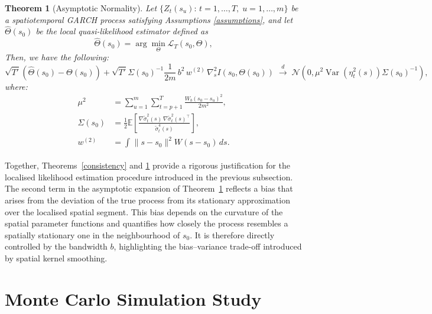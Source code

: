 \documentclass[fleqn,11pt]{article}
\newtheorem{theorem}{Theorem}
\begin{document}
\begin{theorem}[Asymptotic Normality]\label{normality}
Let $\{Z_t(s_u):\, t = 1,\dots,T,\; u = 1,\dots,m\}$ be a spatiotemporal GARCH process satisfying Assumptions \ref{assumptions}, and let $\hat\Theta(s_0)$ be the local quasi-likelihood estimator defined as
$$
\hat\Theta(s_0) = \arg \min_{\Theta } \mathcal{L}_T(s_0, \Theta),
$$
Then, we have the following:\\
$$
\sqrt{T'}\left(\hat{\Theta}(s_0)-\Theta(s_0)\right) + \sqrt{T'} \Sigma(s_0)^{-1}  \frac{1}{2m}\, b^2\, w^{(2)}\, \nabla_s^2 I \left(s_0, \Theta(s_0)\right)
\;\xrightarrow{d}\;
\mathcal{N}\left(0, \mu^2 \operatorname{Var}\left(\eta_t^2(s)\right) \Sigma(s_0)^{-1} \right),$$
where:
$$
\begin{aligned}
\mu^2 &= \sum_{u=1}^m \sum_{t=p+1}^{T} \frac{W_b(s_0 - s_u)^2}{2 m^2}, \\
\Sigma(s_0) &= \frac{1}{2} \mathbb{E}\left[ \frac{\nabla \widetilde{\sigma}_t^2(s)\, \nabla \widetilde{\sigma}_t^2(s)^\top}{\widetilde{\sigma}_t^4(s)} \right],\\   w^{(2)} &= \int_{} \| s-s_0\|^2 W( s-s_0)\, ds .
\end{aligned}$$
\end{theorem}

Together, Theorems~\ref{consistency} and \ref{normality} provide a rigorous justification for the localised likelihood estimation procedure introduced in the previous subsection. The second term in the asymptotic expansion of Theorem~\ref{normality} reflects a bias that arises from the deviation of the true process from its stationary approximation over the localised spatial segment. This bias depends on the curvature of the spatial parameter functions and quantifies how closely the process resembles a spatially stationary one in the neighbourhood of $s_0$.
It is therefore directly controlled by the bandwidth $b$, highlighting the bias–variance trade-off introduced by spatial kernel smoothing.



\section{Monte Carlo Simulation Study}\label{sec:MC}
\end{document}
